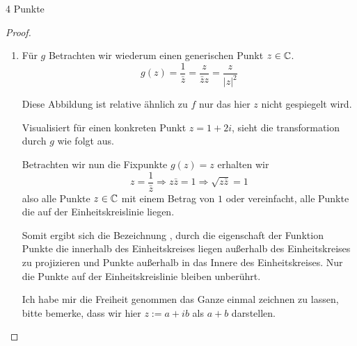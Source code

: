 \documentclass{../problemset}
\begin{document}
\begin{problem}[Einheitskreis]{4 Punkte}
\begin{proof}
\begin{enumerate}
		\item Für $g$ Betrachten wir wiederum einen generischen Punkt $z \in \mathbb{C}$. \[
			      g(z) = \frac{1}{\bar{z}} = \frac{z}{\bar{z}z} = \frac{z}{{|z|}^2}
		      \]

		      Diese Abbildung ist relative ähnlich zu $f$ nur das hier $z$ nicht gespiegelt
		      wird.

		      Visualisiert für einen konkreten Punkt $z = 1 + 2i$, sieht die transformation
		      durch $g$ wie folgt aus.


		      Betrachten wir nun die Fixpunkte $g(z) = z$ erhalten wir \[
			      z = \frac{1}{\bar{z}} \Rightarrow z \bar{z} = 1 \Rightarrow \sqrt{z \bar{z}} = 1
		      \] also alle Punkte $z \in \mathbb{C}$ mit einem Betrag von $1$ oder vereinfacht,
		      alle Punkte die auf der Einheitskreislinie liegen.

		      Somit ergibt sich die Bezeichnung ,
		      durch die eigenschaft der Funktion Punkte die innerhalb des Einheitskreises
		      liegen außerhalb des Einheitskreises zu projizieren und Punkte außerhalb in das
		      Innere des Einheitskreises. Nur die Punkte auf der Einheitskreislinie bleiben
		      unberührt.

		      Ich habe mir die Freiheit genommen das Ganze einmal zeichnen zu lassen, bitte
		      bemerke, dass wir hier $z := a + ib$ als $a + b$ darstellen.


\end{enumerate}
\end{proof}
\end{problem}
\end{document}
